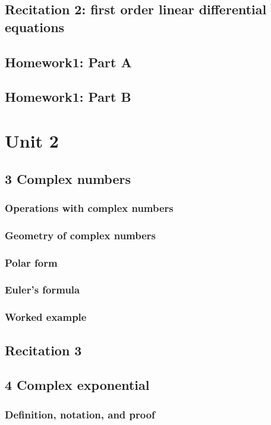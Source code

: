 \documentclass[8pt, a4paper]{article}
\begin{document}
\subsection{Recitation 2: first order linear differential equations}

\subsection{Homework1: Part A}

\subsection{Homework1: Part B}

\section{Unit 2}
\clearpage

\subsection{3 Complex numbers}
\subsubsection{Operations with complex numbers}
\subsubsection{Geometry of complex numbers}
\subsubsection{Polar form}
\subsubsection{Euler's formula}
\subsubsection{Worked example}

\subsection{Recitation 3}

\subsection{4 Complex exponential}
\subsubsection{Definition, notation, and proof}
\end{document}
